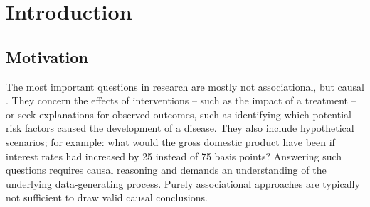 




\chapter{Introduction}

\section{Motivation}


The most important questions in research are mostly not associational, but causal \citep{pearl2009}. They concern the effects of interventions -- such as the impact of a treatment -- or seek explanations for observed outcomes, such as identifying which potential risk factors caused the development of a disease. They also include hypothetical scenarios; for example: what would the gross domestic product have been if interest rates had increased by 25 instead of 75 basis points? Answering such questions requires causal reasoning and demands an understanding of the underlying data-generating process. Purely associational approaches are typically not sufficient to draw valid causal conclusions.



